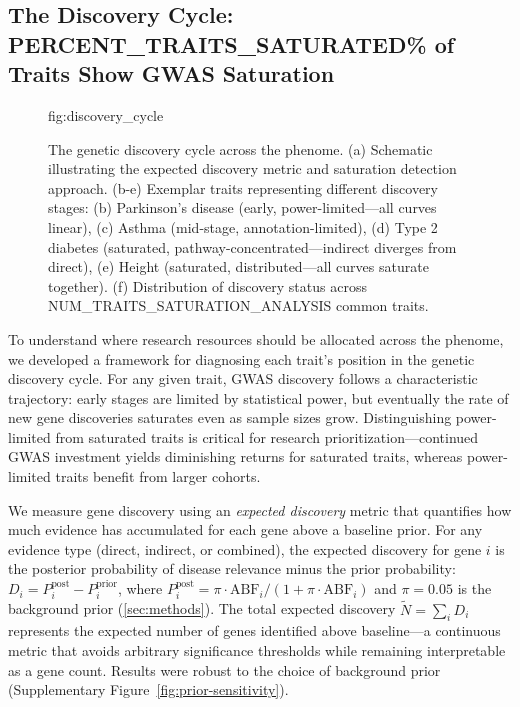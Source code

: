 \subsection{The Discovery Cycle: {{PERCENT_TRAITS_SATURATED}}\% of Traits Show GWAS Saturation}

\begin{figure}[t!]
    \centering
    {{fig:discovery_cycle}}
    \caption{The genetic discovery cycle across the phenome. (a) Schematic illustrating the expected discovery metric and saturation detection approach. (b-e) Exemplar traits representing different discovery stages: (b) Parkinson's disease (early, power-limited---all curves linear), (c) Asthma (mid-stage, annotation-limited), (d) Type 2 diabetes (saturated, pathway-concentrated---indirect diverges from direct), (e) Height (saturated, distributed---all curves saturate together). (f) Distribution of discovery status across {{NUM_TRAITS_SATURATION_ANALYSIS}} common traits.}
    \label{fig:discovery-cycle}
\end{figure}

To understand where research resources should be allocated across the phenome, we developed a framework for diagnosing each trait's position in the genetic discovery cycle. For any given trait, GWAS discovery follows a characteristic trajectory: early stages are limited by statistical power, but eventually the rate of new gene discoveries saturates even as sample sizes grow. Distinguishing power-limited from saturated traits is critical for research prioritization---continued GWAS investment yields diminishing returns for saturated traits, whereas power-limited traits benefit from larger cohorts.

We measure gene discovery using an \textit{expected discovery} metric that quantifies how much evidence has accumulated for each gene above a baseline prior. For any evidence type (direct, indirect, or combined), the expected discovery for gene $i$ is the posterior probability of disease relevance minus the prior probability: $D_i = P_i^{\text{post}} - P_i^{\text{prior}}$, where $P_i^{\text{post}} = \pi \cdot \text{ABF}_i / (1 + \pi \cdot \text{ABF}_i)$ and $\pi = 0.05$ is the background prior (\ref{sec:methods}). The total expected discovery $\tilde{N} = \sum_i D_i$ represents the expected number of genes identified above baseline---a continuous metric that avoids arbitrary significance thresholds while remaining interpretable as a gene count. Results were robust to the choice of background prior (Supplementary Figure~\ref{fig:prior-sensitivity}).

